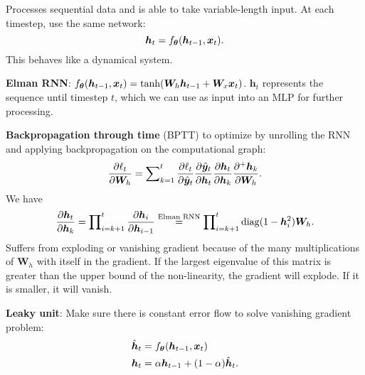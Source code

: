 \documentclass{article}
\newcommand{\lft}{\mathopen{}\mathclose\bgroup\left}
\newcommand{\rgt}{\aftergroup\egroup\right}
\renewcommand{\vec}[1]{\bm{#1}}
\newcommand{\mat}[1]{\bm{#1}}
\newenvironment{topic}[1]
{\textbf{\sffamily \colorbox{black}{\rlap{\textbf{\textcolor{white}{#1}}}\hspace{\linewidth}\hspace{-2\fboxsep}}} \\ \vspace{0.2cm}}
{}
\begin{document}
\begin{multicols*}{2}
\begin{topic}{Fully convolutional neural networks}
    \end{topic}

    \begin{topic}{Recurrent neural networks}

        Processes sequential data and is able to take variable-length input. At each timestep, use the same
        network: \[
            \vec{h}_t = f_{\vec{\theta}} \lft( \vec{h}_{t-1}, \vec{x}_t \rgt).
        \]
        This behaves like a dynamical system.

        \textbf{Elman RNN}: $f_{\vec{\theta}}(\vec{h}_{t-1}, \vec{x}_t) = \tanh \lft( \mat{W}_h \vec{h}_{t-1} + \mat{W}_x \vec{x}_t \rgt)$.
        $\vec{h}_t$ represents the sequence until timestep $t$, which we can use as input into an
        MLP for further processing.

        \textbf{Backpropagation through time} (BPTT) to optimize by unrolling the RNN and applying backpropagation
        on the computational graph: \[
            \pdv{\ell_t}{\mat{W}_h} = \sum\nolimits_{k=1}^{t} \pdv{\ell_t}{\hat{\vec{y}}_t} \pdv{\hat{\vec{y}}_t}{\vec{h}_t} \pdv{\vec{h}_t}{\vec{h}_k} \pdv{^+ \vec{h}_k}{\mat{W}_h}.
        \]
        We have \[
            \pdv{\vec{h}_t}{\vec{h}_k} = \prod\nolimits_{i=k+1}^t \pdv{\vec{h}_i}{\vec{h}_{i-1}} \overset{\text{Elman RNN}}{=} \prod\nolimits_{i=k+1}^{t} \mathrm{diag}(1 - \vec{h}_i^2) \mat{W}_h.
        \]
        Suffers from exploding or vanishing gradient because of the many multiplications of $\mat{W}_h$
        with itself in the gradient. If the largest eigenvalue of this matrix is greater than the upper
        bound of the non-linearity, the gradient will explode. If it is smaller, it will vanish.

        \textbf{Leaky unit}: Make sure there is constant error flow to solve vanishing gradient problem:
        \begin{align*}
            \hat{\vec{h}}_t & = f_{\vec{\theta}}\lft( \vec{h}_{t-1}, \vec{x}_t \rgt) \\
            \vec{h}_t       & = \alpha \vec{h}_{t-1} + (1-\alpha) \hat{\vec{h}}_t.
        \end{align*}


\end{topic}
\end{multicols*}
\end{document}
